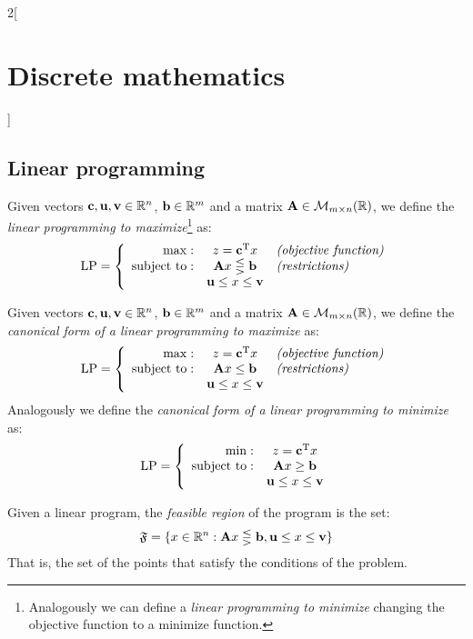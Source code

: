 \documentclass[../../../main.tex]{subfiles}
\begin{document}
\begin{multicols}{2}[\section{Discrete mathematics}]
    \subsection{Linear programming}
    \begin{definition}
        Given vectors $\boldsymbol{\mathrm{c}},\boldsymbol{\mathrm{u}},\boldsymbol{\mathrm{v}}\in\mathbb{R} ^n$, $\boldsymbol{\mathrm{b}}\in\mathbb{R} ^m$ and a matrix $\boldsymbol{\mathrm{A}}\in\mathcal{M}_{m\times n}(\mathbb{R} )$, we define the \textit{linear programming to maximize}\footnote{Analogously we can define a \textit{linear programming to minimize} changing the objective function to a minimize function.} as: $$\text{LP}=\left\{\begin{array}{rcl}
                \max:              & z=\vb{c}^{\mathrm{T}}x         & \textit{(objective function)} \\
                \text{subject to}: & \boldsymbol{\mathrm{A}}x\lesseqgtr \boldsymbol{\mathrm{b}} & \textit{(restrictions)}       \\
                                   & \boldsymbol{\mathrm{u}}\leq x\leq \boldsymbol{\mathrm{v}}  &
            \end{array}\right.$$
    \end{definition}
    \begin{definition}
        Given vectors $\boldsymbol{\mathrm{c}},\boldsymbol{\mathrm{u}},\boldsymbol{\mathrm{v}}\in\mathbb{R} ^n$, $\boldsymbol{\mathrm{b}}\in\mathbb{R} ^m$ and a matrix $\boldsymbol{\mathrm{A}}\in\mathcal{M}_{m\times n}(\mathbb{R} )$, we define the \textit{canonical form of a linear programming to maximize} as: $$\text{LP}=\left\{\begin{array}{rcl}
                \max:              & z=\vb{c}^{\mathrm{T}}x        & \textit{(objective function)} \\
                \text{subject to}: & \boldsymbol{\mathrm{A}}x\leq \boldsymbol{\mathrm{b}}      & \textit{(restrictions)}       \\
                                   & \boldsymbol{\mathrm{u}}\leq x\leq \boldsymbol{\mathrm{v}} &
            \end{array}\right.$$
        Analogously we define the \textit{canonical form of a linear programming to minimize} as: $$\text{LP}=\left\{\begin{array}{rc}
                \min:              & z=\vb{c}^{\mathrm{T}}x        \\
                \text{subject to}: & \boldsymbol{\mathrm{A}}x\geq \boldsymbol{\mathrm{b}}      \\
                                   & \boldsymbol{\mathrm{u}}\leq x\leq \boldsymbol{\mathrm{v}}
            \end{array}\right.$$
    \end{definition}
    \begin{definition}
        Given a linear program, the \textit{feasible region} of the program is the set: $$\mathfrak{F}=\{x\in\mathbb{R} ^n:\boldsymbol{\mathrm{A}}x\lesseqgtr \boldsymbol{\mathrm{b}},\boldsymbol{\mathrm{u}}\leq x\leq \boldsymbol{\mathrm{v}}\}$$ That is, the set of the points that satisfy the conditions of the problem.

\end{definition}
\end{multicols}
\end{document}
